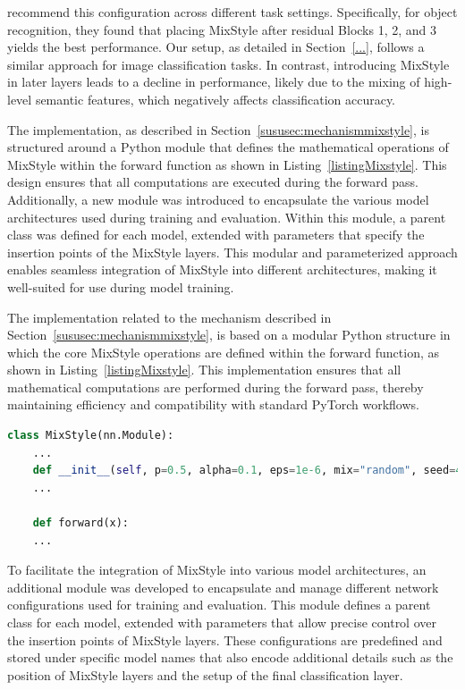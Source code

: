 \cite{mixstyle_ref} recommend this configuration across different task settings. Specifically, for object recognition, they found that placing MixStyle after residual Blocks 1, 2, and 3 yields the best performance. Our setup, as detailed in Section~\ref{...}, follows a similar approach for image classification tasks. In contrast, introducing MixStyle in later layers leads to a decline in performance, likely due to the mixing of high-level semantic features, which negatively affects classification accuracy.

The implementation, as described in Section~\ref{sususec:mechanismmixstyle}, is structured around a Python module that defines the mathematical operations of MixStyle within the forward function as shown in Listing~\ref{listingMixstyle}. This design ensures that all computations are executed during the forward pass. Additionally, a new module was introduced to encapsulate the various model architectures used during training and evaluation. Within this module, a parent class was defined for each model, extended with parameters that specify the insertion points of the MixStyle layers. This modular and parameterized approach enables seamless integration of MixStyle into different architectures, making it well-suited for use during model training.

The implementation related to the mechanism described in Section~\ref{sususec:mechanismmixstyle}, is based on a modular Python structure in which the core MixStyle operations are defined within the forward function, as shown in Listing~\ref{listingMixstyle}. This implementation ensures that all mathematical computations are performed during the forward pass, thereby maintaining efficiency and compatibility with standard PyTorch workflows.

\begin{lstlisting}[language=Python, caption={MixStyle implementation structure}, label=listingMixstyle]
	class MixStyle(nn.Module):
	...
	def __init__(self, p=0.5, alpha=0.1, eps=1e-6, mix="random", seed=42):
	...
	
	def forward(x):
	...
\end{lstlisting}

To facilitate the integration of MixStyle into various model architectures, an additional module was developed to encapsulate and manage different network configurations used for training and evaluation. This module defines a parent class for each model, extended with parameters that allow precise control over the insertion points of MixStyle layers. These configurations are predefined and stored under specific model names that also encode additional details such as the position of MixStyle layers and the setup of the final classification layer.


